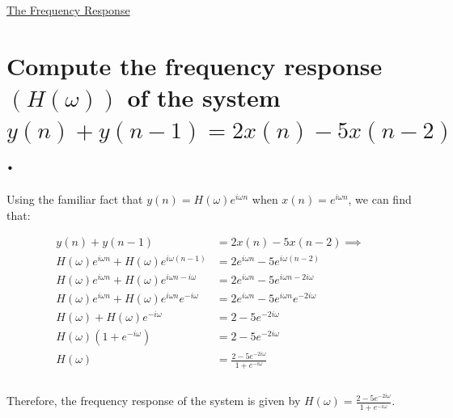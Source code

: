 \documentclass{article}
\renewcommand{\thesubsection}{\thesection.\alph{subsection}}
\begin{document}
\newpage

\begin{center}
	\Large{\underline{The Frequency Response}}
\end{center}

\section[Question ~\thesubsection]{Compute the frequency response $(H(\omega))$ of the system $y(n) + y(n - 1) = 2x(n) - 5x(n - 2)$.}

Using the familiar fact that $y(n) = H(\omega)e^{i{\omega}n}$ when $x(n) = e^{i{\omega}n}$, we can find that:

\begin{align*}
	y(n) + y(n - 1) &= 2x(n) - 5x(n - 2) \implies \\
	H(\omega)e^{i{\omega}n} + H(\omega)e^{i{\omega}(n - 1)} &= 2e^{i{\omega}n} - 5e^{i{\omega}(n - 2)} \\
	H(\omega)e^{i{\omega}n} + H(\omega)e^{i{\omega}n - i{\omega}} &= 2e^{i{\omega}n} - 5e^{i{\omega}n - 2i{\omega}} \\
	H(\omega)e^{i{\omega}n} + H(\omega)e^{i{\omega}n}e^{-i{\omega}} &= 2e^{i{\omega}n} - 5e^{i{\omega}n}e^{-2i{\omega}} \\
	H(\omega) + H(\omega)e^{-i{\omega}} &= 2 - 5e^{-2i{\omega}} \\
	H(\omega)(1 + e^{-i{\omega}}) &= 2 - 5e^{-2i{\omega}} \\
	H(\omega) &= \frac{2 - 5e^{-2i{\omega}}}{1 + e^{-i{\omega}}} \\\\
\end{align*}

Therefore, the frequency response of the system is given by $H(\omega) = \frac{2 - 5e^{-2i{\omega}}}{1 + e^{-i{\omega}}}$.
\end{document}

